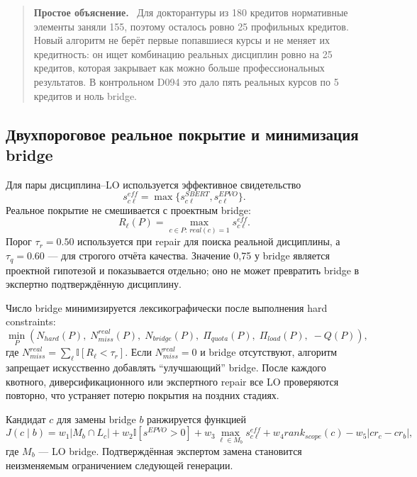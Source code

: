 \documentclass[twoside,11pt]{article}
\newenvironment{plainbox}{%
  \begin{quote}\small\noindent\textbf{Простое объяснение.}\ }{%
  \end{quote}}
\begin{document}
\begin{plainbox}
Для докторантуры из 180 кредитов нормативные элементы заняли 155, поэтому
осталось ровно 25 профильных кредитов. Новый алгоритм не берёт первые попавшиеся
курсы и не меняет их кредитность: он ищет комбинацию реальных дисциплин ровно на
25 кредитов, которая закрывает как можно больше профессиональных результатов.
В контрольном D094 это дало пять реальных курсов по 5 кредитов и ноль bridge.
\end{plainbox}

\subsection{Двухпороговое реальное покрытие и минимизация bridge}

Для пары дисциплина--LO используется эффективное свидетельство
\begin{equation}
s_{c\ell}^{eff}=\max\{s_{c\ell}^{SBERT},s_{c\ell}^{EPVO}\}.
\label{eq:effective-lo-link}
\end{equation}
Реальное покрытие не смешивается с проектным bridge:
\begin{equation}
R_{\ell}(P)=\max_{c\in P:\,real(c)=1}s_{c\ell}^{eff}.
\label{eq:real-lo-coverage}
\end{equation}
Порог $\tau_r=0.50$ используется при repair для поиска реальной дисциплины,
а $\tau_q=0.60$ --- для строгого отчёта качества. Значение 0,75 у bridge
является проектной гипотезой и показывается отдельно; оно не может превратить
bridge в экспертно подтверждённую дисциплину.

Число bridge минимизируется лексикографически после выполнения hard constraints:
\begin{equation}
\min_P\left(
N_{hard}(P),\;N_{miss}^{real}(P),\;N_{bridge}(P),\;
\Pi_{quota}(P),\;\Pi_{load}(P),\;-Q(P)
\right),
\label{eq:lexicographic-repair}
\end{equation}
где $N_{miss}^{real}=\sum_{\ell}\mathbb{I}[R_{\ell}<\tau_r]$.
Если $N_{miss}^{real}=0$ и bridge отсутствуют, алгоритм запрещает искусственно
добавлять ``улучшающий'' bridge. После каждого квотного, диверсификационного или
экспертного repair все LO проверяются повторно, что устраняет потерю покрытия
на поздних стадиях.

Кандидат $c$ для замены bridge $b$ ранжируется функцией
\begin{equation}
J(c\mid b)=w_1|M_b\cap L_c|+w_2\mathbb{I}[s^{EPVO}>0]
+w_3\max_{\ell\in M_b}s_{c\ell}^{eff}
+w_4 rank_{scope}(c)-w_5|cr_c-cr_b|,
\label{eq:bridge-candidate-ranking}
\end{equation}
где $M_b$ --- LO bridge. Подтверждённая экспертом замена становится
неизменяемым ограничением следующей генерации.
\end{document}
